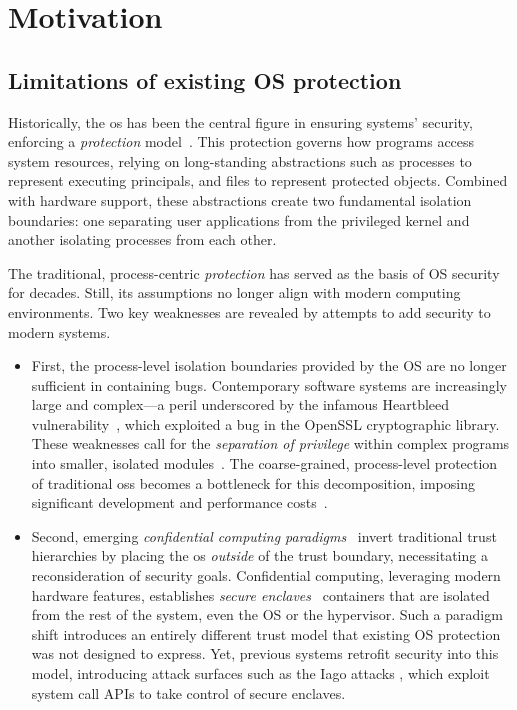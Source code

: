\clearpage

\section{Motivation}





\subsection{Limitations of existing OS protection}

Historically, the \gls{os} has been the central figure in ensuring systems' security, enforcing a \emph{protection} model~\cite{lampsonprotection}.
This protection governs how programs access system resources, relying on long-standing abstractions such as processes to represent executing principals, and files to represent protected objects.
Combined with hardware support, these abstractions create two fundamental isolation boundaries: one separating user applications from the privileged kernel and another isolating processes from each other.

The traditional, process-centric \emph{protection} has served as the basis of OS security for decades. Still, its assumptions no longer align with modern computing environments.
Two key weaknesses are revealed by attempts to add security to modern systems.

\begin{itemize}
	\item First, the process-level isolation boundaries provided by the OS are no longer sufficient in containing bugs.
	      Contemporary software systems are increasingly large and complex—a peril underscored by the infamous Heartbleed vulnerability~\cite{heartbleed}, which exploited a bug in the OpenSSL cryptographic library.
	      These weaknesses call for the \emph{separation of privilege} within complex programs into smaller, isolated modules~\cite{capacity,erim,hakc,rlbox,privtrans,gudka2015clean}.
	      The coarse-grained, process-level protection of traditional \glspl{os} becomes a bottleneck for this decomposition, imposing significant development and performance costs~\cite{erim,capacity}.
	\item
	      Second, emerging \emph{confidential computing paradigms}~\cite{confidential,google-confidential-computing,sgx,kaplan_amd_nodate,cca} invert traditional trust hierarchies by placing the \gls{os} \emph{outside} of the trust boundary, necessitating a reconsideration of security goals.
	      Confidential computing, leveraging modern hardware features, establishes \emph{secure enclaves} \dash\ containers that are isolated from the rest of the system, even the OS or the hypervisor.
	      Such a paradigm shift introduces an entirely different trust model that existing OS protection was not designed to express.
	      Yet, previous systems retrofit security into this model, introducing attack surfaces such as the Iago attacks \cite{checkoway2013iago}, which exploit system call APIs to take control of secure enclaves.
\end{itemize}


